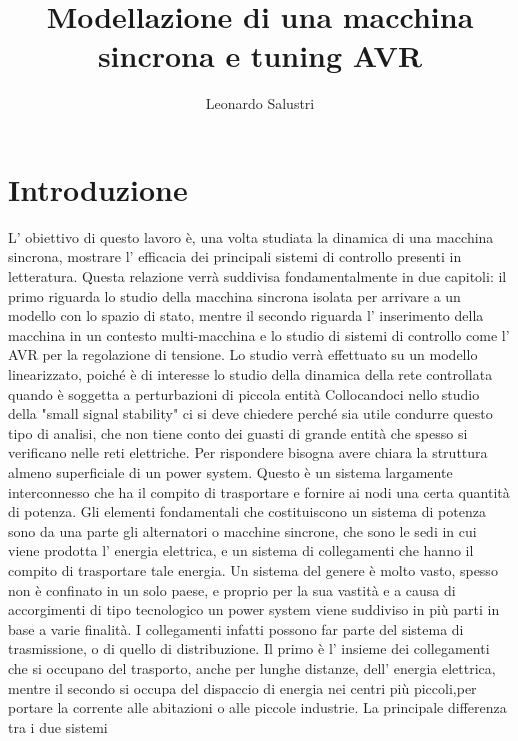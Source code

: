 \documentclass[Lau,noexaminfo]{sapthesis}
\title{Modellazione di una macchina sincrona e tuning AVR}
\author{Leonardo Salustri}
\begin{document}
	\frontmatter
	\maketitle
	\dedication{Grazie}
	
	\tableofcontents
	
	\setcounter{secnumdepth}{1}
	\setcounter{tocdepth}{1}
	\mainmatter
	\section*{Introduzione}
	L' obiettivo di questo lavoro è, una volta studiata la dinamica di una macchina sincrona, mostrare l' efficacia dei principali sistemi di controllo presenti in letteratura.
	Questa relazione verrà suddivisa fondamentalmente in due capitoli: il primo riguarda lo studio della macchina sincrona isolata per arrivare a un modello con lo spazio di stato, mentre il
	secondo riguarda l' inserimento della macchina in un contesto multi-macchina e lo studio di sistemi di controllo come l' AVR per la regolazione di tensione.
	Lo studio verrà effettuato su un modello linearizzato, poiché è di interesse lo studio della dinamica della rete controllata quando è soggetta a perturbazioni di piccola entità
	Collocandoci nello studio della "small signal stability" ci si deve chiedere perché sia utile condurre questo tipo di analisi, che non tiene conto dei guasti di 
	grande entità che spesso si verificano nelle reti elettriche. Per rispondere bisogna avere chiara la struttura almeno superficiale di un power system.
	Questo è un sistema largamente interconnesso che ha il compito di trasportare e fornire ai nodi una certa quantità di potenza. Gli elementi fondamentali che costituiscono
	un sistema di potenza sono da una parte gli alternatori o macchine sincrone, che sono le sedi in cui viene prodotta l' energia elettrica, e un sistema di collegamenti
	che hanno il compito di trasportare tale energia. Un sistema del genere è molto vasto, spesso non è confinato in un solo paese, e proprio per la sua vastità e a causa di
	accorgimenti di tipo tecnologico un power system viene suddiviso in più parti in base a varie finalità. I collegamenti infatti possono far parte del sistema di trasmissione,
	o di quello di distribuzione. Il primo è l' insieme dei collegamenti che si occupano del trasporto, anche per lunghe distanze, dell' energia elettrica, mentre il secondo
	si occupa del dispaccio di energia nei centri più piccoli,per portare la corrente alle abitazioni o alle piccole industrie. La principale differenza tra i due sistemi
\end{document}
